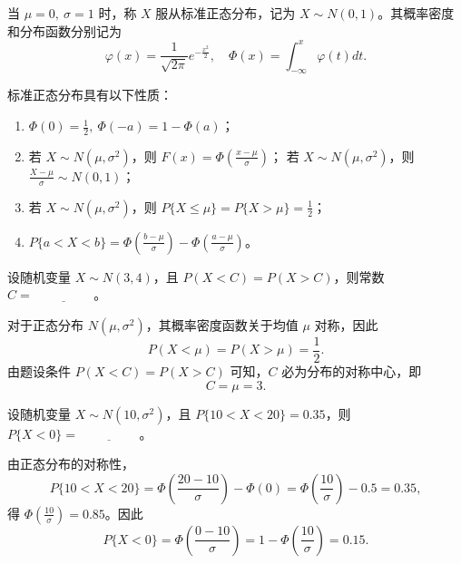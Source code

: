 \documentclass[lang=cn,11pt]{elegantbook}
\begin{document}
\begin{definition}[标准正态分布] \label{def:std-normal}
当 $\mu = 0,\ \sigma = 1$ 时，称 $X$ 服从标准正态分布，记为 $X \sim N(0,1)$。其概率密度和分布函数分别记为
\[
\varphi(x) = \frac{1}{\sqrt{2\pi}} e^{-\frac{x^2}{2}},\quad \Phi(x) = \int_{-\infty}^x \varphi(t) dt.
\]
\end{definition}

\begin{property}\label{prop:normal-properties}
标准正态分布具有以下性质：
\begin{enumerate}
    \item $\Phi(0) = \frac{1}{2},\ \Phi(-a) = 1 - \Phi(a)$；
    \item 若 $X \sim N(\mu,\sigma^2)$，则 $F(x) = \Phi\left(\frac{x-\mu}{\sigma}\right)$； 若 $X \sim N(\mu,\sigma^2)$，则 $\frac{X-\mu}{\sigma} \sim N(0,1)$；
    \item 若 $X \sim N(\mu,\sigma^2)$，则 $P\{X \le \mu\} = P\{X > \mu\} = \frac{1}{2}$；
    \item $P\{a < X < b\} = \Phi\left(\frac{b-\mu}{\sigma}\right) - \Phi\left(\frac{a-\mu}{\sigma}\right)$。
\end{enumerate}
\end{property}

\begin{exercise}[正态分布对称点] 
设随机变量 $X\sim N(3,4)$，且 $P(X<C)=P(X>C)$，则常数 $C=\underline{\hspace{2cm}}$。
\end{exercise}
\begin{solution}
对于正态分布 $N(\mu,\sigma^2)$，其概率密度函数关于均值 $\mu$ 对称，因此
\[
P(X<\mu)=P(X>\mu)=\frac{1}{2}.
\]
由题设条件 $P(X<C)=P(X>C)$ 可知，$C$ 必为分布的对称中心，即
\[
C=\mu=3.
\]
\end{solution}

\begin{exercise}
设随机变量 $X \sim N(10,\sigma^2)$，且 $P\{10 < X < 20\} = 0.35$，则 $P\{X < 0\} = \underline{\hspace{2cm}}$。
\end{exercise}
\begin{solution}
由正态分布的对称性，
\[
P\{10 < X < 20\} = \Phi\left(\frac{20-10}{\sigma}\right) - \Phi(0) = \Phi\left(\frac{10}{\sigma}\right) - 0.5 = 0.35,
\]
得 $\Phi\left(\frac{10}{\sigma}\right) = 0.85$。因此
\[
P\{X < 0\} = \Phi\left(\frac{0-10}{\sigma}\right) = 1 - \Phi\left(\frac{10}{\sigma}\right) = 0.15.
\]
\end{solution}
\end{document}
